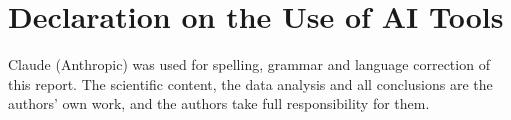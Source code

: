 \documentclass[10pt]{article}
\begin{document}
	
	\setcounter{tocdepth}{2}
	\begin{singlespace}
		\hypersetup{linkcolor=black}
		\tableofcontents
	\end{singlespace}
	\clearpage
	
	
	
	
	
	\clearpage
	
	\clearpage
	\printbibliography
	\listoffigures \listoftables
	\section*{Declaration on the Use of AI Tools}
	Claude (Anthropic) was used for spelling, grammar and language correction of
	this report. The scientific content, the data analysis and all conclusions are
	the authors' own work, and the authors take full responsibility for them.
\end{document}
